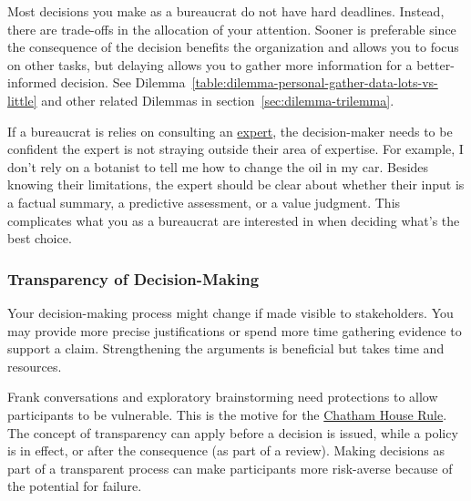 Most decisions you make as a bureaucrat do not have hard deadlines. Instead, there are trade-offs in the allocation of your attention. Sooner is preferable since the consequence of the decision benefits the organization and allows you to focus on other tasks, but delaying allows you to gather more information for a better-informed decision. See 
Dilemma~\ref{table:dilemma-personal-gather-data-lots-vs-little}
and other related Dilemmas in section~\ref{sec:dilemma-trilemma}.


If a bureaucrat is relies on consulting an
\hyperref[sec:expertise]{expert},
the decision-maker needs to be confident the expert is not  straying outside their area of expertise. For example, I don't rely on a botanist  to tell me how to change the oil in my car. 
Besides knowing their limitations, the expert should be clear about whether their input is a factual summary, a predictive assessment, or a value judgment. This complicates what you as a bureaucrat are interested in when deciding what's the best choice.


\subsubsection{Transparency of Decision-Making\label{sec:transparency-of-decisions}}

Your decision-making process might change if made visible to stakeholders. You may provide more precise justifications or spend more time gathering evidence to support a claim. Strengthening the arguments is beneficial but takes time and resources. 

Frank conversations and exploratory brainstorming need protections to allow participants to be vulnerable. 
This is the motive for the \href{https://en.wikipedia.org/wiki/Chatham_House_Rule}{Chatham House Rule}. 
The concept of transparency can apply before a decision is issued, while a policy is in effect, or after the consequence (as part of a review). 
Making decisions as part of a transparent process can make participants more risk-averse because of the potential for failure.

